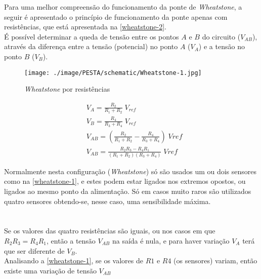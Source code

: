 \vspace{.5cm}
Para uma melhor compreensão do funcionamento da ponte de \textit{Wheatstone}, a seguir é apresentado o princípio de funcionamento da ponte apenas com resistências, que está apresentada na \autoref{wheatstone-2}.
\\
É possível determinar a queda de tensão entre os pontos $A$ e $B$ do circuito ($V_{AB}$), através da diferença entre a tensão (potencial) no ponto $A$ ($V_A$) e a tensão no ponto $B$ ($V_B$).
\\
\begin{minipage}[!b]{.45\linewidth}
	\begin{figure}[H]
		\captionsetup{justification=raggedright,singlelinecheck=false}
		\flushleft
		\texttt{[image: ./image/PESTA/schematic/Wheatstone-1.jpg]}
		\caption{\textit{Wheatstone} por resistências \cite{book-10}}
		\label{wheatstone-2}
	\end{figure}
\end{minipage}
\begin{minipage}[!b]{.5\linewidth}
	\setlength{\jot}{10pt}%
	\small
	\begin{align}
		\label{eq:wheatstone}
		&V_A =  \frac{R_2}{R_1 + R_2} \; V_{ref} \\ &V_B=\frac{R_4}{R_3 + R_4} \; V_{ref} \\
		&V_{AB}= \left(\frac{R_2}{R_1 + R_2} - \frac{R_4}{R_3 + R_4}\right) \; Vref \\
		&V_{AB} = \frac{R_2 R_3 - R_4 R_1}{(R_1 + R_2)(R_3 + R_4)} \; Vref
	\end{align}
\vspace{1pt}
\end{minipage}
Normalmente nesta configuração (\textit{Wheatstone}) só são usados um ou dois sensores como na \autoref{wheatstone-1}, e estes podem estar ligados nos extremos opostos, ou ligados ao mesmo ponto da alimentação. Só em casos muito raros são utilizados quatro sensores obtendo-se, nesse caso, uma sensibilidade máxima.
\\
\\
\\
Se os valores das quatro resistências são iguais, ou nos casos em que $R_2 R_3 = R_4 R_1$, então a tensão $V_{AB}$ na saída é nula, e para haver variação $V_A$ terá que ser diferente de $V_B$.
\\
Analisando a \autoref{wheatstone-1}, se os valores de $R1$ e $R4$ (os sensores) variam, então existe uma variação de tensão $V_{AB}$
